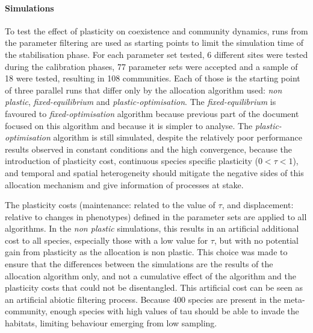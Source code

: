 \paragraph{Simulations}
To test the effect of plasticity on coexistence and community dynamics, runs from the parameter filtering are used as starting points to limit the simulation time of the stabilisation phase. For each parameter set tested, 6 different sites were tested during the calibration phases, 77 parameter sets were accepted and a sample of 18 were tested, resulting in 108 communities. Each of those is the starting point of three parallel runs that differ only by the allocation algorithm used: \textit{non plastic}, \textit{fixed-equilibrium} and \textit{plastic-optimisation}. The \textit{fixed-equilibrium} is favoured to \textit{fixed-optimisation} algorithm because previous part of the document focused on this algorithm and because it is simpler to analyse. The \textit{plastic-optimisation} algorithm is still simulated, despite the relatively poor performance results observed in constant conditions and the high convergence, because the introduction of plasticity cost, continuous species specific plasticity ($0 < \tau < 1$), and temporal and spatial heterogeneity should mitigate the negative sides of this allocation mechanism and give information of processes at stake.

The plasticity costs (maintenance: related to the value of $\tau$, and displacement: relative to changes in phenotypes) defined in the parameter sets are applied to all algorithms. In the \textit{non plastic} simulations, this results in an artificial additional cost to all species, especially those with a low value for $\tau$, but with no potential gain from plasticity as the allocation is non plastic. This choice was made to ensure that the differences between the simulations are the results of the allocation algorithm only, and not a cumulative effect of the algorithm and the plasticity costs that could not be disentangled. This artificial cost can be seen as an artificial abiotic filtering process. Because 400 species are present in the meta-community, enough species with high values of tau should be able to invade the habitats, limiting behaviour emerging from low sampling.




